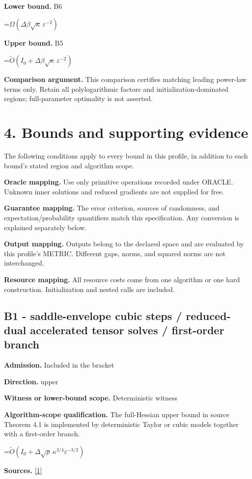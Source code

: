 \documentclass[10pt,a4paper]{article}
\newcommand{\AtlasMath}[1]{\par\begingroup\centering\setbox0=\hbox{$\displaystyle #1$}\ifdim\wd0>1.4\linewidth\typeout{ATLAS WIDE FORMULA: \the\wd0}\fi\ifdim\wd0>\linewidth\resizebox{\linewidth}{!}{\box0}\else\box0\fi\par\endgroup}
\begin{document}
\textbf{Lower bound.} B6

\AtlasMath{\Omega(\Delta\beta\sqrt\kappa\,\varepsilon^{-2})}
\textbf{Upper bound.} B5

\AtlasMath{\widetilde{O}(I_0+\Delta\beta\sqrt\kappa\,\varepsilon^{-2})}
\textbf{Comparison argument.} This comparison certifies matching leading power-law terms only. Retain all polylogarithmic factors and initialization-dominated regions; full-parameter optimality is not asserted.

\section{4. Bounds and supporting evidence}
The following conditions apply to every bound in this profile, in addition to each bound's stated region and algorithm scope.

\textbf{Oracle mapping.} Use only primitive operations recorded under ORACLE. Unknown inner solutions and reduced gradients are not supplied for free.

\textbf{Guarantee mapping.} The error criterion, sources of randomness, and expectation/probability quantifiers match this specification. Any conversion is explained separately below.

\textbf{Output mapping.} Outputs belong to the declared space and are evaluated by this profile's METRIC. Different gaps, norms, and squared norms are not interchanged.

\textbf{Resource mapping.} All resource costs come from one algorithm or one hard construction. Initialization and nested calls are included.

\subsection{B1 - saddle-envelope cubic steps / reduced-dual accelerated tensor solves / first-order branch}
\textbf{Admission.} Included in the bracket

\textbf{Direction.} upper

\textbf{Witness or lower-bound scope.} Deterministic witness

\textbf{Algorithm-scope qualification.} The full-Hessian upper bound in source Theorem 4.1 is implemented by deterministic Taylor or cubic models together with a first-order branch.

\AtlasMath{\widetilde{O}(I_0+\Delta\sqrt\rho\,\kappa^{3/4}\varepsilon^{-3/2})}
\textbf{Sources.} \href{https://arxiv.org/pdf/2610.16771v2}{[1]}
\end{document}
